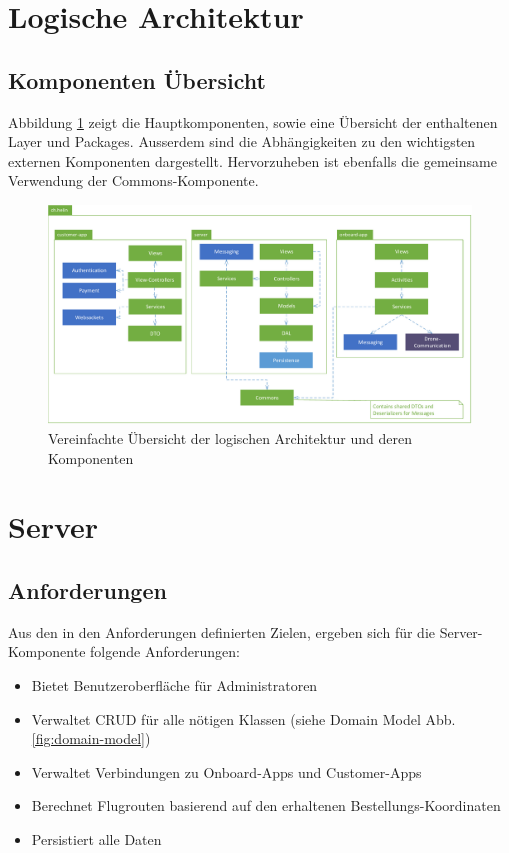 \section{Logische Architektur}

\subsection{Komponenten Übersicht}

Abbildung \ref{fig:logical-architecture-overview} zeigt die Hauptkomponenten, sowie eine Übersicht der enthaltenen Layer und Packages. Ausserdem sind die Abhängigkeiten zu den wichtigsten externen Komponenten dargestellt. Hervorzuheben ist ebenfalls die gemeinsame Verwendung der Commons-Komponente. 

\begin{figure}[H]
	\includegraphics[width=1.0\textwidth]{images/logical-architecture-overview.pdf}
	\caption{Vereinfachte Übersicht der logischen Architektur und deren Komponenten }
	\label{fig:logical-architecture-overview}
\end{figure}

\section{Server}

\subsection{Anforderungen}
Aus den in den Anforderungen definierten Zielen, ergeben sich für die Server-Komponente folgende Anforderungen:

\begin{itemize}
	\item Bietet Benutzeroberfläche für Administratoren
	\item Verwaltet \Gls{CRUD} für alle nötigen Klassen (siehe Domain Model Abb. \ref{fig:domain-model})
	\item Verwaltet Verbindungen zu Onboard-Apps und Customer-Apps
	\item Berechnet Flugrouten basierend auf den erhaltenen Bestellungs-Koordinaten
	\item Persistiert alle Daten
\end{itemize}

